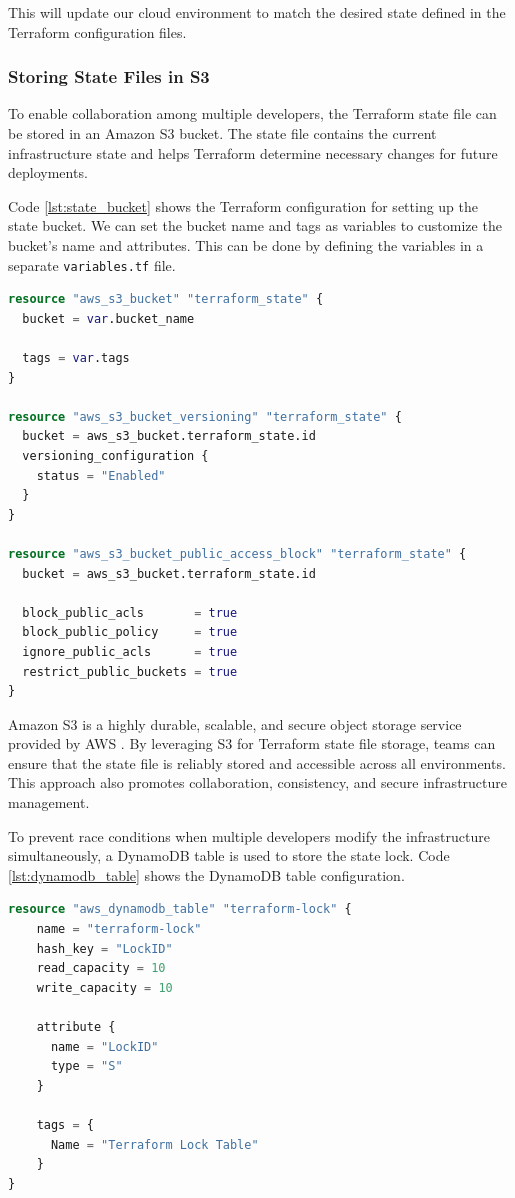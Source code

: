 This will update our cloud environment to match the desired state defined in the Terraform configuration files.


\subsubsection{Storing State Files in S3}
To enable collaboration among multiple developers, the Terraform state file can be stored in an Amazon S3 bucket. The state file contains the current infrastructure state and helps Terraform determine necessary changes for future deployments.


Code \ref{lst:state_bucket} shows the Terraform configuration for setting up the state bucket. We can set the bucket name and tags as variables to customize the bucket's name and attributes. This can be done by defining the variables in a separate \texttt{variables.tf} file.

\begin{lstlisting}[language=Terraform, caption={Terraform Configuration for Setting Up State Bucket}, label={lst:state_bucket}]
resource "aws_s3_bucket" "terraform_state" {
  bucket = var.bucket_name

  tags = var.tags
}

resource "aws_s3_bucket_versioning" "terraform_state" {
  bucket = aws_s3_bucket.terraform_state.id
  versioning_configuration {
    status = "Enabled"
  }
}

resource "aws_s3_bucket_public_access_block" "terraform_state" {
  bucket = aws_s3_bucket.terraform_state.id

  block_public_acls       = true
  block_public_policy     = true
  ignore_public_acls      = true
  restrict_public_buckets = true
}
\end{lstlisting}

Amazon S3 is a highly durable, scalable, and secure object storage service provided by AWS \cite{s3}. By leveraging S3 for Terraform state file storage, teams can ensure that the state file is reliably stored and accessible across all environments. This approach also promotes collaboration, consistency, and secure infrastructure management.

To prevent race conditions when multiple developers modify the infrastructure simultaneously, a DynamoDB table \cite{dynamodb} is used to store the state lock. Code \ref{lst:dynamodb_table} shows the DynamoDB table configuration.

\begin{lstlisting}[language=Terraform, caption={Terraform Configuration for Setting Up DynamoDB Table}, label={lst:dynamodb_table}]
resource "aws_dynamodb_table" "terraform-lock" {
    name = "terraform-lock"
    hash_key = "LockID"
    read_capacity = 10
    write_capacity = 10
    
    attribute {
      name = "LockID"
      type = "S"
    }
    
    tags = {
      Name = "Terraform Lock Table"
    }
}
\end{lstlisting}

